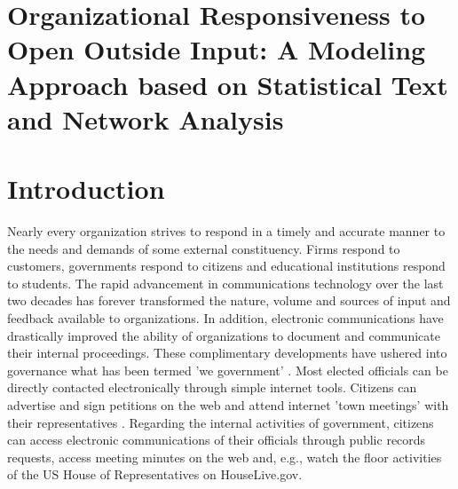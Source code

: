 

\section*{\Large Organizational Responsiveness to Open Outside Input:  A Modeling Approach based on Statistical Text and Network Analysis}



\section{Introduction}

Nearly every organization strives to respond in a timely and accurate manner to the needs and demands of some external constituency. Firms respond to customers, governments respond to citizens and educational institutions respond to students. The rapid advancement in communications technology over the last two decades has forever transformed the nature, volume and sources of input and feedback available to organizations. In addition, electronic communications have drastically improved the ability of organizations to document and communicate their internal proceedings. These complimentary developments have ushered into governance what has been termed 'we government' \cite{Linders2012}. Most elected officials can be directly contacted electronically through simple internet tools. Citizens can advertise and sign petitions on the web and attend internet 'town meetings' with their representatives \cite{Kavanaugh2010} . Regarding the internal activities of government, citizens can access electronic communications of their officials through public records requests, access meeting minutes on the web and, e.g., watch the floor activities of the US House of Representatives on HouseLive.gov.

